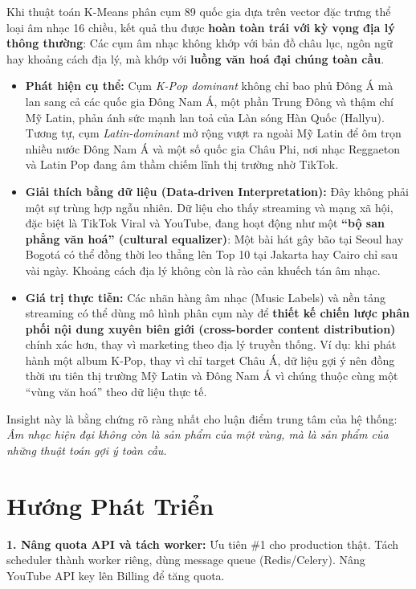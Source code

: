 \documentclass[12pt,a4paper]{report}
\begin{document}
Khi thuật toán K-Means phân cụm 89 quốc gia dựa trên vector đặc trưng thể loại âm nhạc 16 chiều, kết quả thu được \textbf{hoàn toàn trái với kỳ vọng địa lý thông thường}: Các cụm âm nhạc không khớp với bản đồ châu lục, ngôn ngữ hay khoảng cách địa lý, mà khớp với \textbf{luồng văn hoá đại chúng toàn cầu}.

\begin{itemize}
    \item \textbf{Phát hiện cụ thể:} Cụm \textit{K-Pop dominant} không chỉ bao phủ Đông Á mà lan sang cả các quốc gia Đông Nam Á, một phần Trung Đông và thậm chí Mỹ Latin, phản ánh sức mạnh lan toả của Làn sóng Hàn Quốc (Hallyu). Tương tự, cụm \textit{Latin-dominant} mở rộng vượt ra ngoài Mỹ Latin để ôm trọn nhiều nước Đông Nam Á và một số quốc gia Châu Phi, nơi nhạc Reggaeton và Latin Pop đang âm thầm chiếm lĩnh thị trường nhờ TikTok.
    \item \textbf{Giải thích bằng dữ liệu (Data-driven Interpretation):} Đây không phải một sự trùng hợp ngẫu nhiên. Dữ liệu cho thấy streaming và mạng xã hội, đặc biệt là TikTok Viral và YouTube, đang hoạt động như một \textbf{``bộ san phẳng văn hoá'' (cultural equalizer)}: Một bài hát gây bão tại Seoul hay Bogotá có thể đồng thời leo thẳng lên Top 10 tại Jakarta hay Cairo chỉ sau vài ngày. Khoảng cách địa lý không còn là rào cản khuếch tán âm nhạc.
    \item \textbf{Giá trị thực tiễn:} Các nhãn hàng âm nhạc (Music Labels) và nền tảng streaming có thể dùng mô hình phân cụm này để \textbf{thiết kế chiến lược phân phối nội dung xuyên biên giới (cross-border content distribution)} chính xác hơn, thay vì marketing theo địa lý truyền thống. Ví dụ: khi phát hành một album K-Pop, thay vì chỉ target Châu Á, dữ liệu gợi ý nên đồng thời ưu tiên thị trường Mỹ Latin và Đông Nam Á vì chúng thuộc cùng một ``vùng văn hoá'' theo dữ liệu thực tế.
\end{itemize}

Insight này là bằng chứng rõ ràng nhất cho luận điểm trung tâm của hệ thống: \textit{Âm nhạc hiện đại không còn là sản phẩm của một vùng, mà là sản phẩm của những thuật toán gợi ý toàn cầu.}

\section{Hướng Phát Triển}

\textbf{1. Nâng quota API và tách worker:} Ưu tiên \#1 cho production thật. Tách scheduler thành worker riêng, dùng message queue (Redis/Celery). Nâng YouTube API key lên Billing để tăng quota.
\end{document}
